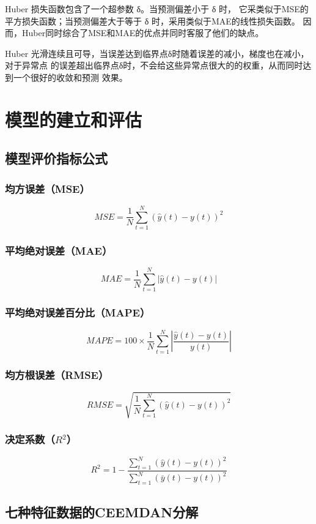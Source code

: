\documentclass[AutoFakeBold]{LZUThesis}
\begin{document}
Huber 损失函数\cite{huber1992robust}包含了一个超参数 δ。当预测偏差小于 δ 时，
它采类似于MSE的平方损失函数；当预测偏差大于等于 δ 时，采用类似于MAE的线性损失函数。
因而，Huber同时综合了MSE和MAE的优点并同时客服了他们的缺点。

Huber 光滑连续且可导，当误差达到临界点δ时随着误差的减小，梯度也在减小，对于异常点
的误差超出临界点δ时，不会给这些异常点很大的的权重，从而同时达到一个很好的收敛和预测
效果。

\chapter{模型的建立和评估}
\section{模型评价指标公式}
\subsection{均方误差（MSE）}
$$MSE=\frac{1}{N}\sum_{t=1}^{N}\left(\hat{y}\left(t\right)-y\left(t\right)\right)^2$$

\subsection{平均绝对误差（MAE）}
$$MAE=\frac{1}{N}\sum_{t=1}^{N}\left|\hat{y}\left(t\right)-y\left(t\right)\right|$$

\subsection{平均绝对误差百分比（MAPE）}
$$MAPE=100\times\frac{1}{N}\sum_{t=1}^{N}\left|\frac{\hat{y}\left(t\right)-y\left(t\right)}{y\left(t\right)}\right|$$

\subsection{均方根误差（RMSE）}
$$RMSE=\sqrt{\frac{1}{N}\sum_{t=1}^{N}\left(\hat{y}\left(t\right)-y\left(t\right)\right)^2}$$

\subsection{决定系数（$R^2$）}
$$R^2=1-\frac{\sum_{t=1}^{N}(\hat{y}\left(t\right)-y\left(t\right))^2}{\sum_{t=1}^{N}(\bar{y}\left(t\right)-y\left(t\right))^2}$$

\section{七种特征数据的CEEMDAN分解}
\end{document}
